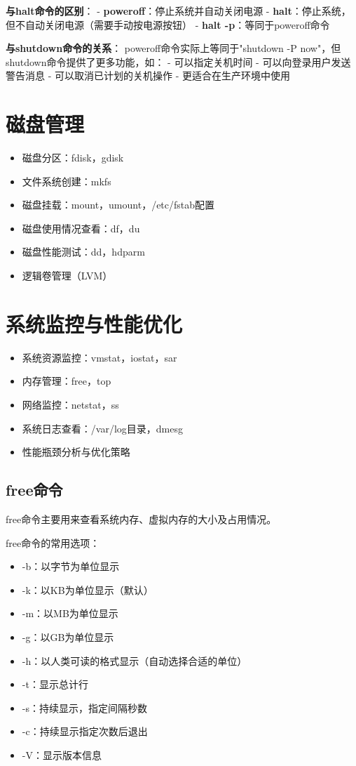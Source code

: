 \documentclass[12pt,UTF8]{ctexbook}
\begin{document}
\textbf{与halt命令的区别}：
- \textbf{poweroff}：停止系统并自动关闭电源
- \textbf{halt}：停止系统，但不自动关闭电源（需要手动按电源按钮）
- \textbf{halt -p}：等同于poweroff命令

\textbf{与shutdown命令的关系}：
poweroff命令实际上等同于"shutdown -P now"，但shutdown命令提供了更多功能，如：
- 可以指定关机时间
- 可以向登录用户发送警告消息
- 可以取消已计划的关机操作
- 更适合在生产环境中使用

\section{磁盘管理}
\begin{itemize}
    \item 磁盘分区：fdisk，gdisk
    \item 文件系统创建：mkfs
    \item 磁盘挂载：mount，umount，/etc/fstab配置
    \item 磁盘使用情况查看：df，du
    \item 磁盘性能测试：dd，hdparm
    \item 逻辑卷管理（LVM）
\end{itemize}

\section{系统监控与性能优化}
\begin{itemize}
    \item 系统资源监控：vmstat，iostat，sar
    \item 内存管理：free，top
    \item 网络监控：netstat，ss
    \item 系统日志查看：/var/log目录，dmesg
    \item 性能瓶颈分析与优化策略
\end{itemize}

\subsection{free命令}
free命令主要用来查看系统内存、虚拟内存的大小及占用情况。

free命令的常用选项：
\begin{itemize}
    \item -b：以字节为单位显示
    \item -k：以KB为单位显示（默认）
    \item -m：以MB为单位显示
    \item -g：以GB为单位显示
    \item -h：以人类可读的格式显示（自动选择合适的单位）
    \item -t：显示总计行
    \item -s：持续显示，指定间隔秒数
    \item -c：持续显示指定次数后退出
    \item -V：显示版本信息
\end{itemize}
\end{document}
